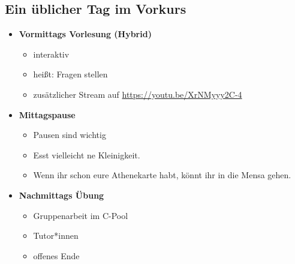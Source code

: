 \subsection{Ein üblicher Tag im Vorkurs}
\begin{frame}
    \slidehead
    \begin{itemize}
        \item \textbf{Vormittags Vorlesung (Hybrid)}
            \begin{itemize}
                \item interaktiv
                \item heißt: Fragen stellen
                \item zusätzlicher Stream auf \href{https://youtu.be/XrNMyyy2C-4}{https://youtu.be/XrNMyyy2C-4}
            \end{itemize}
            \pause
        \item \textbf{Mittagspause}
            \begin{itemize}
                \item Pausen sind wichtig
                \item Esst vielleicht ne Kleinigkeit.
                \item Wenn ihr schon eure Athenekarte habt, könnt ihr in die Mensa gehen.
            \end{itemize}
            \pause
        \item \textbf{Nachmittags Übung}
            \begin{itemize}
                \item Gruppenarbeit im C-Pool
                \item Tutor*innen
                \item offenes Ende
            \end{itemize}
    \end{itemize}
\end{frame}

